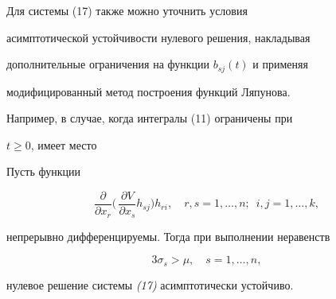

 


\begin{note} Для системы (17) также можно уточнить условия 


асимптотической устойчивости нулевого решения, накладывая 


дополнительные ограничения на функции $b_{sj}(t)$ и применяя 


модифицированный метод построения функций Ляпунова. 


\end{note} 


 


Например, в случае, когда интегралы (11) ограничены при 


$t\ge 0$, имеет место 


 


\begin{thm} Пусть функции 


$$ 


\frac{\partial}{\partial x_r}\biggl(\, 


\frac{\partial V}{\partial x_s}h_{sj}\biggr)h_{ri},\quad 


r,s=1,\dotsc,n;\ \; i,j=1,\dotsc,k,


$$ 


непрерывно дифференцируемы. Тогда при выполнении неравенств 


\begin{equation} 


3\sigma_s>\mu,\quad s=1,\dotsc,n, 


\end{equation} 


нулевое решение системы {\em (17)} асимптотически устойчиво. 


\end{thm} 


